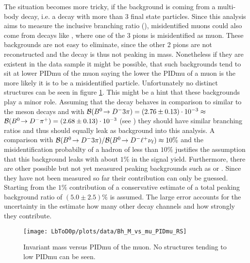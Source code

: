 The situation becomes more tricky, if the background is coming from a multi-body \Lb decay, i.e. a decay with more than 3 final state particles.
Since this analysis aims to measure the inclusive branching ratio \BR(\LbToDpmunuX), misidentified muons could also come from decays like \decay{\Lb}{\Dz\proton 3\pi}, where one of the 3 pions is misidentified as muon.
These backgrounds are not easy to eliminate, since the other 2 pions are not reconstructed and the decay is thus not peaking in \Dz\proton\mun mass.
Nonetheless if they are existent in the data sample it might be possible, that such backgrounds tend to sit at lower PIDmu of the muon saying the lower the PIDmu of a muon is the more likely it is to be a misidentified particle.
Unfortunately no distinct structures can be seen in figure \ref{fig:plot_D0pmuMass_vs_muPIDmu}.
This might be a hint that these backgrounds play a minor role.
Assuming that the decay \decay{\Lb}{\Dz\proton 3\pi} behaves in comparison to \decay{\Lb}{\Dz\proton\pim} similar to the meson decays \decay{\Bd}{\Dm 3\pi} and \decay{\Bd}{\Dm\pip} with 
${\cal B}({{B}^0}\!\rightarrow {\ensuremath{{D}^-}} 3\pi) = (2.76 \pm 0.13) \cdot 10^{-3} \approx$ 
${\cal B}({{B}^0}\!\rightarrow {\ensuremath{{D}^-}}{\ensuremath{{\pi}^+}}) = (2.68 \pm 0.13) \cdot 10^{-3}$ (see \cite{PDG})
they should have similar branching ratios and thus should equally leak as background into this analysis.
A comparison with ${\cal B}({{B}^0}\!\rightarrow {\ensuremath{{D}^-}} 3\pi)/{\cal B}({{B}^0}\!\rightarrow {\ensuremath{{D}^-}}{\ensuremath{\ell^+}}{\ensuremath{{\nu}_\ell}}) \approx 10\%$ and the misidentification probabilty of a hadron of less than $10\%$ \cite{muonID_Performance} justifies the assumption that this background leaks with about $1\%$ in the signal yield.
Furthermore, there are other possible but not yet measured peaking backgrounds such as \decay{\Lb}{\Dz\proton\rhom} or \decay{\Lb}{\Dz\proton\pim\rhoz}.
Since they have not been measured so far their contribution can only be guessed.
Starting from the $1\%$ contribution of \decay{\Lb}{\Dz\proton 3\pi} a conservative estimate of a total peaking background ratio of $(5.0 \pm 2.5)\%$ is assumed.
The large error accounts for the uncertainty in the estimate how many other decay channels and how strongly they contribute.
\begin{figure}[ptb]
	\centering
	\texttt{[image: LbToD0p/plots/data/Bh\_M\_vs\_mu\_PIDmu\_RS]}
	\caption{Invariant \Dz\proton\mun mass versus PIDmu of the muon. No structures tending to low PIDmu can be seen.}
	\label{fig:plot_D0pmuMass_vs_muPIDmu}
\end{figure}

